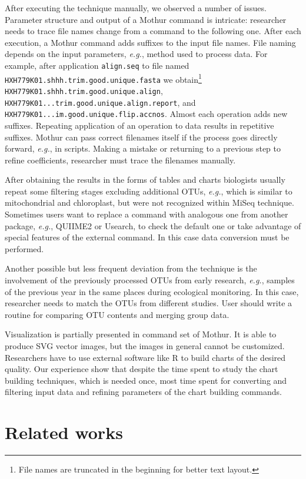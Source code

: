 \documentclass[a4paper]{jpconf}
\begin{document}
After executing the technique manually, we observed a number of issues. Parameter structure and output of a Mothur command is intricate: researcher needs to trace file names change from a command to the following one.  After each execution, a Mothur command adds suffixes to the input file names.  File naming depends on the input parameters, \emph{e.g.}, method used to process data. For example, after application \verb|align.seq| to file named \verb|HXH779K01.shhh.trim.good.unique.fasta| we obtain\footnote{File names are truncated in the beginning for better text layout.} \verb|HXH779K01.shhh.trim.good.unique.align|, \verb|HXH779K01...trim.good.unique.align.report|, and \verb|HXH779K01...im.good.unique.flip.accnos|.  Almost each operation adds new suffixes.  Repeating application of an operation to data results in repetitive suffixes.  Mothur can pass correct filenames itself if the process goes directly forward, \emph{e.g.}, in scripts.  Making a mistake or returning to a previous step to refine coefficients, researcher must trace the filenames manually.

After obtaining the results in the forms of tables and charts biologists usually repeat some filtering stages excluding additional OTUs, \emph{e.g.}, which is similar to mitochondrial and chloroplast, but were not recognized within MiSeq technique.
Sometimes users want to replace a command with analogous one from another package, \emph{e.g.}, QUIIME2 or Usearch, to check the default one or take advantage of special features of the external command. In this case data conversion must be performed.

Another possible but less frequent deviation from the technique is the involvement of the previously processed OTUs from early research, \emph{e.g.}, samples of the previous year in the same places during ecological monitoring. In this case, researcher needs to match the OTUs from different studies. User should write a routine for comparing OTU contents and merging group data.

Visualization is partially presented in command set of Mothur.  It is able to produce SVG vector images, but the images in general cannot be customized.  Researchers have to use external software like R to build charts of the desired quality.  Our experience show that despite the time spent to study the chart building techniques, which is needed once, most time spent for converting and filtering input data and refining parameters of the chart building commands.

\section{Related works}
\label{sec:relworks}
\end{document}
